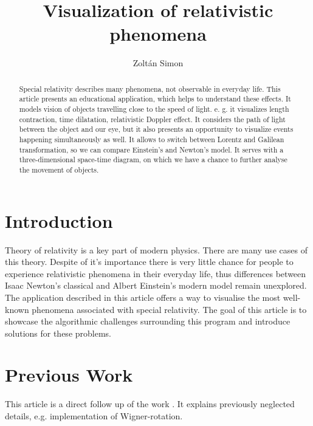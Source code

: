 \documentclass{egpubl}
\title{Visualization of relativistic phenomena}
\author{Zoltán Simon
}
\begin{document}
\maketitle

\begin{abstract}
Special relativity describes many phenomena, not observable in everyday life. This article presents an educational application, which helps to understand these effects. It models vision of objects travelling close to the speed of light. e. g. it visualizes length contraction, time dilatation, relativistic Doppler effect. It considers the path of light between the object and our eye, but it also presents an opportunity to visualize events happening simultaneously as well. It allows to switch between Lorentz and Galilean transformation, so we can compare Einstein's and Newton's model. It serves with a three-dimensional space-time diagram, on which we have a chance to further analyse the movement of objects.
\begin{classification} %
\end{classification}

\end{abstract}

\section{Introduction}
Theory of relativity is a key part of modern physics. There are many use cases of this theory. Despite of it's importance there is very little chance for people to experience relativistic phenomena in their everyday life, thus differences between Isaac Newton's classical and Albert Einstein's modern model remain unexplored. The application described in this article offers a way to visualise the most well-known phenomena associated with special relativity. The goal of this article is to showcase the algorithmic challenges surrounding this program and introduce solutions for these problems. 


\section{Previous Work}

This article is a direct follow up of the work \cite{TDKreport}. It explains previously neglected details, e.g. implementation of Wigner-rotation. 
\end{document}

